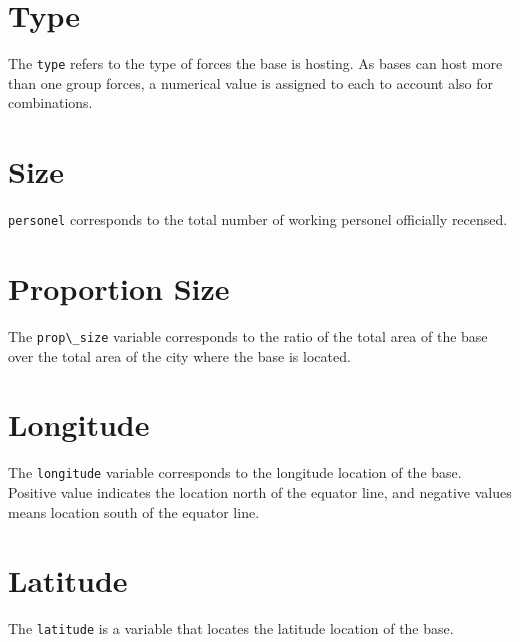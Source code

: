 \documentclass[
]{article}
\begin{document}
\section{Type}\label{type}

The \texttt{type} refers to the type of forces the base is hosting. As
bases can host more than one group forces, a numerical value is assigned
to each to account also for combinations.

\section{Size}\label{size}

\texttt{personel} corresponds to the total number of working personel
officially recensed.

\section{Proportion Size}\label{proportion-size}

The \texttt{prop\textbackslash{}\_size} variable corresponds to the
ratio of the total area of the base over the total area of the city
where the base is located.

\section{Longitude}\label{longitude}

The \texttt{longitude} variable corresponds to the longitude location of
the base. Positive value indicates the location north of the equator
line, and negative values means location south of the equator line.

\section{Latitude}\label{latitude}

The \texttt{latitude} is a variable that locates the latitude location
of the base.
\end{document}
